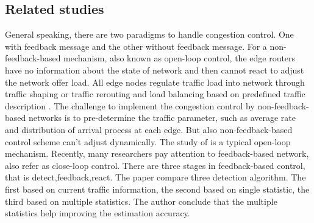 \subsection{Related studies}

General speaking, there are two paradigms to handle congestion control. One with feedback message and the other without feedback message. For a non-feedback-based mechanism, also known as open-loop control, the edge routers have no information about the state of network and then cannot react to adjust the network offer load. All edge nodes regulate traffic load into network through traffic shaping or traffic rerouting and load balancing based on predefined traffic
description \cite{ref:feedback-based}. The challenge to implement the congestion control by non-feedback-based networks is to pre-determine the traffic parameter, such as average rate and distribution of arrival process at each edge. But also non-feedback-based control scheme can't adjust dynamically. The study of \cite{ref:peak-rate} is a typical open-loop mechanism. Recently, many researchers pay attention to feedback-based network, also refer as close-loop control. There are three stages in feedback-based control, that is detect,feedback,react. The paper \cite{ref:long-term-detect}
compare three detection algorithm. The first based on current traffic information, the second based on single statistic, the third based on multiple statistics. The author conclude that the multiple statistics help improving the estimation accuracy.  
